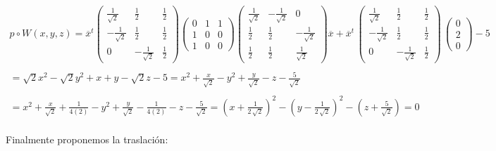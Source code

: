 \documentclass[11pt,letterpaper]{article}
\begin{document}
    \begin{align*}
        p\circ W(x,y,z)=\overline{x}^t \begin{pmatrix}
                \frac{1}{\sqrt{2}} & \frac{1}{2} & \frac{1}{2}\\
                -\frac{1}{\sqrt{2}} & \frac{1}{2}& \frac{1}{2}\\
                 0& -\frac{1}{\sqrt{2}} &\frac{1}{2}
                \end{pmatrix}
                \begin{pmatrix}
                0 & 1 & 1\\
                1 & 0 & 0\\
                1 & 0 & 0
                \end{pmatrix}
                \begin{pmatrix}
                \frac{1}{\sqrt{2}} & -\frac{1}{\sqrt{2}} & 0\\
                \frac{1}{2} & \frac{1}{2}& -\frac{1}{\sqrt{2}}\\
                 \frac{1}{2} & \frac{1}{2} &\frac{1}{\sqrt{2}}
                \end{pmatrix}\overline{x}+\overline{x}^t\,\begin{pmatrix}
                \frac{1}{\sqrt{2}} & \frac{1}{2} & \frac{1}{2}\\
                -\frac{1}{\sqrt{2}} & \frac{1}{2}& \frac{1}{2}\\
                 0& -\frac{1}{\sqrt{2}} &\frac{1}{2}
                \end{pmatrix}\,
                \begin{pmatrix}
                0 \\
                2\\
                0
                \end{pmatrix}-5\,\\
                \,\\
                =\sqrt{2}x^2-\sqrt{2}y^2+x+y-\sqrt{2}z-5
                =x^2+\frac{x}{\sqrt{2}}-y^2+\frac{y}{\sqrt{2}}-z-\frac{5}{\sqrt{2}}\,\\
                \,\\
                =x^2+\frac{x}{\sqrt{2}}+\frac{1}{4(2)}-y^2+\frac{y}{\sqrt{2}}-\frac{1}{4(2)}-z-\frac{5}{\sqrt{2}}=\left(x+\frac{1}{2\,\sqrt{2}}\right)^2-\left(y-\frac{1}{2\,\sqrt{2}}\right)^2-\left(z+\frac{5}{\sqrt{2}}\right)=0
    \end{align*}\,\\
    \newpage
    Finalmente proponemos la traslaci\'on:\,\\
\end{document}
